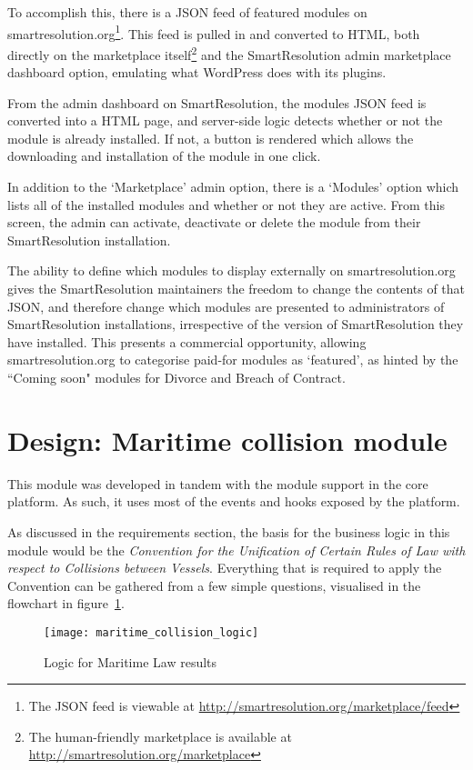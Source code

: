 To accomplish this, there is a JSON feed of featured modules on smartresolution.org\footnote{The JSON feed is viewable at \url{http://smartresolution.org/marketplace/feed}}. This feed is pulled in and converted to HTML, both directly on the marketplace itself\footnote{The human-friendly marketplace is available at \url{http://smartresolution.org/marketplace}} and the SmartResolution admin marketplace dashboard option, emulating what WordPress does with its plugins.

From the admin dashboard on SmartResolution, the modules JSON feed is converted into a HTML page, and server-side logic detects whether or not the module is already installed. If not, a button is rendered which allows the downloading and installation of the module in one click.

In addition to the `Marketplace' admin option, there is a `Modules' option which lists all of the installed modules and whether or not they are active. From this screen, the admin can activate, deactivate or delete the module from their SmartResolution installation.

The ability to define which modules to display externally on smartresolution.org gives the SmartResolution maintainers the freedom to change the contents of that JSON, and therefore change which modules are presented to administrators of SmartResolution installations, irrespective of the version of SmartResolution they have installed. This presents a commercial opportunity, allowing smartresolution.org to categorise paid-for modules as `featured', as hinted by the ``Coming soon" modules for Divorce and Breach of Contract.

\section{Design: Maritime collision module}

This module was developed in tandem with the module support in the core platform. As such, it uses most of the events and hooks exposed by the platform.

As discussed in the requirements section, the basis for the business logic in this module would be the \emph{Convention for the Unification of Certain Rules of Law with respect to Collisions between Vessels}. Everything that is required to apply the Convention can be gathered from a few simple questions, visualised in the flowchart in figure~\ref{uml:maritimeLogic}.

\begin{figure}[h!]
  \centering
    \ifimages
    \texttt{[image: maritime\_collision\_logic]}
    \fi
  \caption{Logic for Maritime Law results}
  \label{uml:maritimeLogic}
\end{figure}


